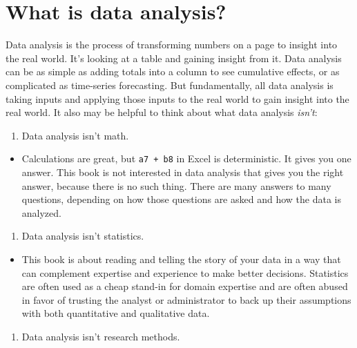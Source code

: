 \documentclass[]{book}
\providecommand{\tightlist}{%
  \setlength{\itemsep}{0pt}\setlength{\parskip}{0pt}}
\begin{document}
\hypertarget{what-is-data-analysis}{%
\section{What is data analysis?}\label{what-is-data-analysis}}

Data analysis is the process of transforming numbers on a page to insight into the real world. It's looking at a table and gaining insight from it. Data analysis can be as simple as adding totals into a column to see cumulative effects, or as complicated as time-series forecasting. But fundamentally, all data analysis is taking inputs and applying those inputs to the real world to gain insight into the real world. It also may be helpful to think about what data analysis \emph{isn't}:

\begin{enumerate}
\def\labelenumi{\arabic{enumi}.}
\tightlist
\item
  Data analysis isn't math.
\end{enumerate}

\begin{itemize}
\tightlist
\item
  Calculations are great, but \texttt{a7\ +\ b8} in Excel is deterministic. It gives you one answer. This book is not interested in data analysis that gives you the right answer, because there is no such thing. There are many answers to many questions, depending on how those questions are asked and how the data is analyzed.
\end{itemize}

\begin{enumerate}
\def\labelenumi{\arabic{enumi}.}
\setcounter{enumi}{1}
\tightlist
\item
  Data analysis isn't statistics.
\end{enumerate}

\begin{itemize}
\tightlist
\item
  This book is about reading and telling the story of your data in a way that can complement expertise and experience to make better decisions. Statistics are often used as a cheap stand-in for domain expertise and are often abused in favor of trusting the analyst or administrator to back up their assumptions with both quantitative and qualitative data.
\end{itemize}

\begin{enumerate}
\def\labelenumi{\arabic{enumi}.}
\setcounter{enumi}{2}
\tightlist
\item
  Data analysis isn't research methods.
\end{enumerate}
\end{document}
